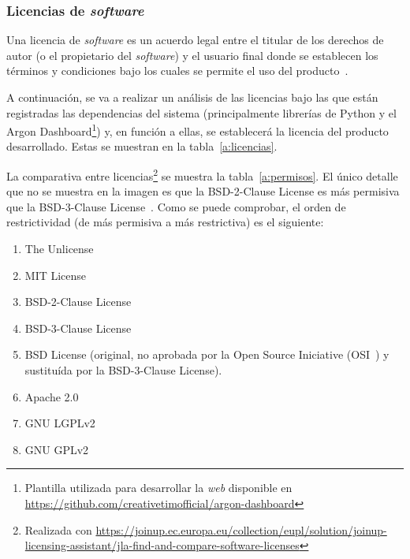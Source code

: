 \subsubsection{Licencias de \textit{software}}

Una licencia de \textit{software} es un acuerdo legal entre el titular de los derechos de autor (o el propietario del \textit{software}) y el usuario final donde se establecen los términos y condiciones bajo los cuales se permite el uso del producto~\cite{licenciaQueEs}.

A continuación, se va a realizar un análisis de las licencias bajo las que están registradas las dependencias del sistema (principalmente librerías de Python y el Argon Dashboard\footnote{Plantilla utilizada para desarrollar la \textit{web} disponible en \url{https://github.com/creativetimofficial/argon-dashboard}}) y, en función a ellas, se establecerá la licencia del producto desarrollado. Estas se muestran en la tabla~\ref{a:licencias}.

La comparativa entre licencias\footnote{Realizada con \url{https://joinup.ec.europa.eu/collection/eupl/solution/joinup-licensing-assistant/jla-find-and-compare-software-licenses}} se muestra la tabla~\ref{a:permisos}. El único detalle que no se muestra en la imagen es que la BSD-2-Clause License es más permisiva que la BSD-3-Clause License~\cite{BSD}. Como se puede comprobar, el orden de restrictividad (de más permisiva a más restrictiva) es el siguiente:

\begin{enumerate}
	\item The Unlicense
	\item MIT License
	\item BSD-2-Clause License
	\item BSD-3-Clause License
	\item BSD License (original, no aprobada por la Open Source Iniciative (OSI~\cite{BSD}) y sustituída por la BSD-3-Clause License).
	\item Apache 2.0
	\item GNU LGPLv2
	\item GNU GPLv2
\end{enumerate}


